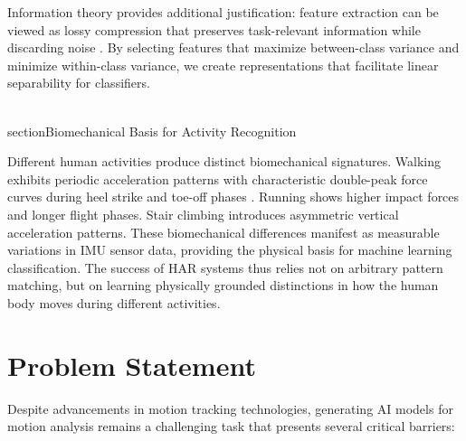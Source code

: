 Information theory provides additional justification: feature extraction can be viewed as lossy compression that preserves task-relevant information while discarding noise \cite{cover2006elements}. By selecting features that maximize between-class variance and minimize within-class variance, we create representations that facilitate linear separability for classifiers.

\\section{Biomechanical Basis for Activity Recognition}

Different human activities produce distinct biomechanical signatures. Walking exhibits periodic acceleration patterns with characteristic double-peak force curves during heel strike and toe-off phases \cite{whittle2014gait}. Running shows higher impact forces and longer flight phases. Stair climbing introduces asymmetric vertical acceleration patterns. These biomechanical differences manifest as measurable variations in IMU sensor data, providing the physical basis for machine learning classification. The success of HAR systems thus relies not on arbitrary pattern matching, but on learning physically grounded distinctions in how the human body moves during different activities.

\section{Problem Statement}

Despite advancements in motion tracking technologies, generating AI models for motion analysis remains a challenging task that presents several critical barriers:

